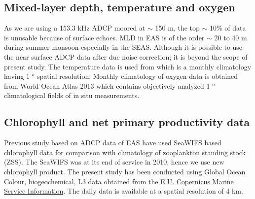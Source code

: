 \documentclass{article}
\begin{document}
	\subsection{Mixed-layer depth, temperature and oxygen}
	As we are using a 153.3 kHz ADCP moored at $\sim$ 150 m, the top $\sim$ 10\% of data is unusable because of surface echoes. MLD in EAS is of the order $\sim$ 20 to 40 m during summer monsoon \citep{shetye1990hydrography,sreenivas2008monthly} especially in the SEAS. Although it is possible to use the near surface ADCP data after due noise correction; it is beyond the scope of present study. The temperature data is used from \citep{chatterjee2012new} which is a monthly climatology having 1 $^o$ spatial resolution. Monthly climatology of oxygen data is obtained from World Ocean Atlas 2013 \citep{garcia2013oxygen} which contains objectively analyzed 1 $^o$ climatological fields of in situ measurements. 
	
	\subsection{Chlorophyll and net primary productivity data}
	Previous study based on ADCP data of EAS \citep{aparna2022seasonal} have used SeaWIFS based chlorophyll data for comparison with climatology of zooplankton standing stock (ZSS). The SeaWIFS was at its end of service in 2010, hence we use new chlorophyll product. The present study has been conducted using Global Ocean Colour, biogeochemical, L3 data obtained from the  \href{https://doi.org/10.48670/moi-00280}{E.U. Copernicus Marine Service Information}. The daily data is available at a spatial resolution of 4 km. 
\end{document}
